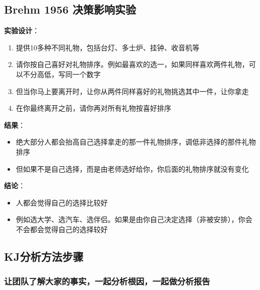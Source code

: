 \hypertarget{brehm-1956-ux51b3ux7b56ux5f71ux54cdux5b9eux9a8c}{%
\subsection{Brehm 1956
决策影响实验}\label{brehm-1956-ux51b3ux7b56ux5f71ux54cdux5b9eux9a8c}}

\textbf{实验设计}：

\begin{enumerate}
\tightlist
\item
  提供10多种不同礼物，包括台灯、多士炉、挂钟、收音机等
\item
  请你按自己喜好对礼物排序。例如最喜欢的选一，如果同样喜欢两件礼物，可以不分高低，写同一个数字
\item
  但当你马上要离开时，让你从两件同样喜好的礼物挑选其中一件，让你拿走
\item
  在你最终离开之前，请你再对所有礼物按喜好排序
\end{enumerate}

\textbf{结果}：

\begin{itemize}
\tightlist
\item
  绝大部分人都会抬高自己选择拿走的那一件礼物排序，调低非选择的那件礼物排序
\item
  但如果不是自己选择，而是由老师选好给你，你后面的礼物排序就没有变化
\end{itemize}

\textbf{结论}：

\begin{itemize}
\tightlist
\item
  人都会觉得自己的选择比较好
\item
  例如选大学、选汽车、选伴侣。如果是由你自己决定选择（非被安排），你会不会都会觉得自己的选择较好
\end{itemize}

\hypertarget{kjux5206ux6790ux65b9ux6cd5ux6b65ux9aa4}{%
\subsection{KJ分析方法步骤}\label{kjux5206ux6790ux65b9ux6cd5ux6b65ux9aa4}}

\hypertarget{ux8ba9ux56e2ux961fux4e86ux89e3ux5927ux5bb6ux7684ux4e8bux5b9eux4e00ux8d77ux5206ux6790ux6839ux56e0ux4e00ux8d77ux505aux5206ux6790ux62a5ux544a}{%
\subsubsection{让团队了解大家的事实，一起分析根因，一起做分析报告}\label{ux8ba9ux56e2ux961fux4e86ux89e3ux5927ux5bb6ux7684ux4e8bux5b9eux4e00ux8d77ux5206ux6790ux6839ux56e0ux4e00ux8d77ux505aux5206ux6790ux62a5ux544a}}

